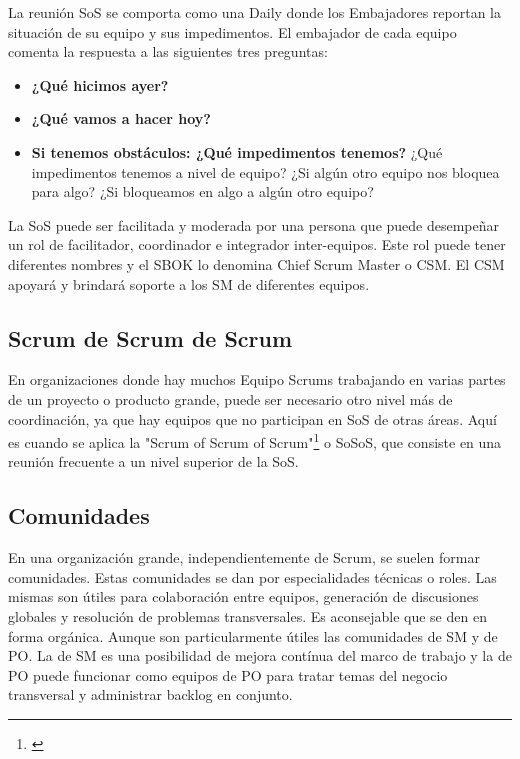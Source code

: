 La reunión SoS se comporta como una Daily donde los Embajadores reportan la situación de su equipo y sus impedimentos. El embajador de cada equipo comenta la respuesta a las siguientes tres preguntas:

\begin{itemize}
\item \textbf{¿Qué hicimos ayer?}
\item \textbf{¿Qué vamos a hacer hoy?}
\item \textbf{Si tenemos obstáculos: ¿Qué impedimentos tenemos?} ¿Qué impedimentos tenemos a nivel de equipo? ¿Si algún otro equipo nos bloquea para algo? ¿Si bloqueamos en algo a algún otro equipo?
\end{itemize}

La SoS puede ser facilitada y moderada por una persona que puede desempeñar un rol de facilitador, coordinador e integrador inter-equipos. Este rol puede tener diferentes nombres y el SBOK lo denomina Chief Scrum Master o CSM. El CSM apoyará y brindará soporte a los SM de diferentes equipos.

\subsection{Scrum de Scrum de Scrum}

En organizaciones donde hay muchos Equipo Scrums trabajando en varias partes de un proyecto o producto grande, puede ser necesario otro nivel más de coordinación, ya que hay equipos que no participan en SoS de otras áreas. Aquí es cuando se aplica la "Scrum of Scrum of Scrum"\footnote{\cite{SBOK-2013}} o SoSoS, que consiste en una reunión frecuente a un nivel superior de la SoS.

\subsection{Comunidades}

En una organización grande, independientemente de Scrum, se suelen formar comunidades. Estas comunidades se dan por especialidades técnicas o roles. Las mismas son útiles para colaboración entre equipos, generación de discusiones globales y resolución de problemas transversales. Es aconsejable que se den en forma orgánica. Aunque son particularmente útiles las comunidades de SM y de PO. La de SM es una posibilidad de mejora contínua del marco de trabajo y la de PO puede funcionar como equipos de PO para tratar temas del negocio transversal y administrar backlog en conjunto.

